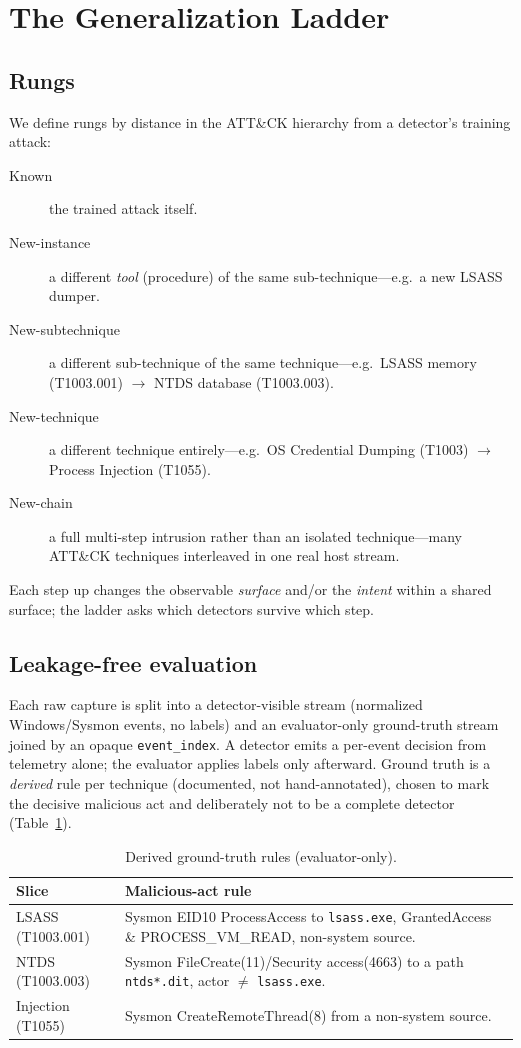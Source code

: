 \documentclass[sigconf,nonacm]{acmart}
\begin{document}
\section{The Generalization Ladder}
\label{sec:ladder}

\subsection{Rungs}
We define rungs by distance in the ATT\&CK hierarchy from a detector's training
attack:
\begin{description}
  \item[Known] the trained attack itself.
  \item[New-instance] a different \emph{tool} (procedure) of the same
  sub-technique---e.g.\ a new LSASS dumper.
  \item[New-subtechnique] a different sub-technique of the same technique---e.g.\
  LSASS memory (T1003.001) $\rightarrow$ NTDS database (T1003.003).
  \item[New-technique] a different technique entirely---e.g.\ OS Credential
  Dumping (T1003) $\rightarrow$ Process Injection (T1055).
  \item[New-chain] a full multi-step intrusion rather than an isolated
  technique---many ATT\&CK techniques interleaved in one real host stream.
\end{description}
Each step up changes the observable \emph{surface} and/or the \emph{intent}
within a shared surface; the ladder asks which detectors survive which step.

\subsection{Leakage-free evaluation}
Each raw capture is split into a detector-visible stream (normalized
Windows/Sysmon events, no labels) and an evaluator-only ground-truth stream
joined by an opaque \texttt{event\_index}. A detector emits a per-event decision
from telemetry alone; the evaluator applies labels only afterward. Ground truth
is a \emph{derived} rule per technique (documented, not hand-annotated), chosen
to mark the decisive malicious act and deliberately not to be a complete
detector (Table~\ref{tab:gt}).

\begin{table}[t]
\caption{Derived ground-truth rules (evaluator-only).}
\label{tab:gt}
\small
\begin{tabular}{@{}lp{5.6cm}@{}}
\toprule
Slice & Malicious-act rule \\
\midrule
LSASS (T1003.001) & Sysmon EID10 ProcessAccess to \texttt{lsass.exe},
GrantedAccess \& PROCESS\_VM\_READ, non-system source. \\
NTDS (T1003.003) & Sysmon FileCreate(11)/Security access(4663) to a path
\texttt{ntds*.dit}, actor $\neq$ \texttt{lsass.exe}. \\
Injection (T1055) & Sysmon CreateRemoteThread(8) from a non-system source. \\
\bottomrule
\end{tabular}
\end{table}
\end{document}
